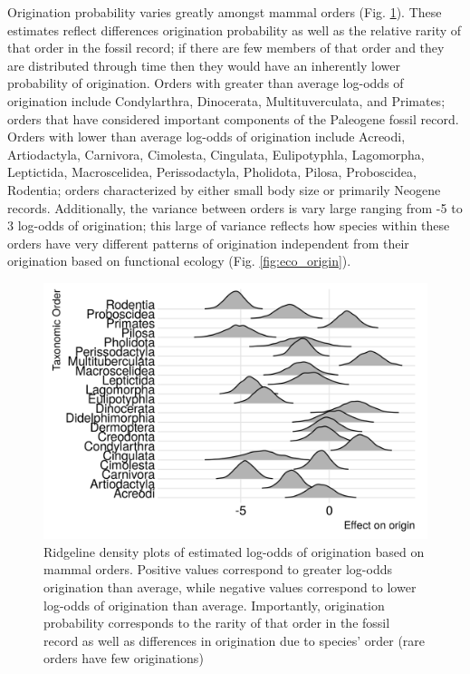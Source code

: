 \documentclass[12pt,letterpaper]{article}
\begin{document}
Origination probability varies greatly amongst mammal orders (Fig. \ref{fig:order_origin}). These estimates reflect differences origination probability as well as the relative rarity of that order in the fossil record; if there are few members of that order and they are distributed through time then they would have an inherently lower probability of origination. Orders with greater than average log-odds of origination include Condylarthra, Dinocerata, Multituverculata, and Primates; orders that have considered important components of the Paleogene fossil record. Orders with lower than average log-odds of origination include Acreodi, Artiodactyla, Carnivora, Cimolesta, Cingulata, Eulipotyphla, Lagomorpha, Leptictida, Macroscelidea, Perissodactyla, Pholidota, Pilosa, Proboscidea, Rodentia; orders characterized by either small body size or primarily Neogene records. Additionally, the variance between orders is vary large ranging from -5 to 3 log-odds of origination; this large of variance reflects how species within these orders have very different patterns of origination independent from their origination based on functional ecology (Fig. \ref{fig:eco_origin}).
\begin{figure}[ht]
  \centering
  \includegraphics[width=\textwidth,height=0.4\textheight,keepaspectratio=true]{figure/order_origin_bd}
  \caption{Ridgeline density plots of estimated log-odds of origination based on mammal orders. Positive values correspond to greater log-odds origination than average, while negative values correspond to lower log-odds of origination than average. Importantly, origination probability corresponds to the rarity of that order in the fossil record as well as differences in origination due to species' order (rare orders have few originations)}
  \label{fig:order_origin}
\end{figure}
\end{document}
